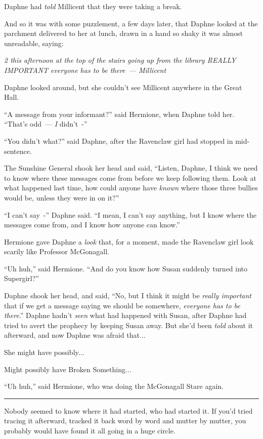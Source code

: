 Daphne had \emph{told} Millicent that they were taking a break.

And so it was with some puzzlement, a few days later, that Daphne looked at the parchment delivered to her at lunch, drawn in a hand so shaky it was almost unreadable, saying:

\emph{2 this afternoon at the top of the stairs going up from the library REALLY IMPORTANT everyone has to be there~--- Millicent}

Daphne looked around, but she couldn't see Millicent anywhere in the Great Hall.

``A message from your informant?'' said Hermione, when Daphne told her. ``That's odd~--- \emph{I} didn't~-''

``You didn't what?'' said Daphne, after the Ravenclaw girl had stopped in mid-sentence.

The Sunshine General shook her head and said, ``Listen, Daphne, I think we need to know where these messages come from before we keep following them. Look at what happened last time, how could anyone have \emph{known} where those three bullies would be, unless they were in on it?''

``I can't say~-'' Daphne said. ``I mean, I can't say anything, but I know where the messages come from, and I know how anyone can know.''

Hermione gave Daphne a \emph{look} that, for a moment, made the Ravenclaw girl look scarily like Professor McGonagall.

``Uh huh,'' said Hermione. ``And do you know how Susan suddenly turned into Supergirl?''

Daphne shook her head, and said, ``No, but I think it might be \emph{really important} that if we get a message saying we should be somewhere, \emph{everyone has to be there}.'' Daphne hadn't \emph{seen} what had happened with Susan, after Daphne had tried to avert the prophecy by keeping Susan away. But she'd been \emph{told} about it afterward, and now Daphne was afraid that...

She might have possibly...

Might possibly have Broken Something...

``Uh huh,'' said Hermione, who was doing the McGonagall Stare again.

\begin{center}\rule{3in}{0.4pt}\end{center}

Nobody seemed to know where it had started, who had started it. If you'd tried tracing it afterward, tracked it back word by word and mutter by mutter, you probably would have found it all going in a huge circle.

